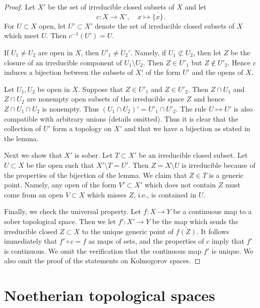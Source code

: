 \begin{proof}
Let $X'$ be the set of irreducible closed subsets of $X$ and let
$$
c : X \to X', \quad x \mapsto \overline{\{x\}}.
$$
For $U \subset X$ open, let $U' \subset X'$ denote the set
of irreducible closed subsets of $X$ which meet $U$.
Then $c^{-1}(U') = U$.

\medskip\noindent
If $U_1 \not = U_2$ are open in $X$, then $U'_1 \not = U_2'$.
Namely, if $U_1 \not \subset U_2$, then
let $Z$ be the closure of an irreducible component of
$U_1 \setminus U_2$.
Then $Z \in U'_1$ but $Z \not \in U'_2$. Hence $c$ induces
a bijection between the subsets of $X'$ of the form $U'$ and the
opens of $X$.

\medskip\noindent
Let $U_1, U_2$ be open in $X$. Suppose that $Z \in U'_1$ and
$Z \in U'_2$. Then $Z \cap U_1$ and $Z \cap U_2$ are nonempty
open subsets of the irreducible space $Z$ and hence $Z \cap U_1 \cap U_2$
is nonempty. Thus $(U_1 \cap U_2)' = U'_1 \cap U'_2$.
The rule $U \mapsto U'$ is also compatible with arbitrary unions
(details omitted). Thus it is clear that the collection of
$U'$ form a topology on $X'$ and that we have a bijection as
stated in the lemma.

\medskip\noindent
Next we show that $X'$ is sober. Let $T \subset X'$ be an irreducible
closed subset. Let $U \subset X$ be the open such that $X' \setminus T = U'$.
Then $Z = X \setminus U$ is irreducible because of the properties
of the bijection of the lemma. We claim that $Z \in T$ is a generic
point. Namely, any open of the form $V' \subset X'$
which does not contain $Z$ must come from an open $V \subset X$
which misses $Z$, i.e., is contained in $U$.

\medskip\noindent
Finally, we check the universal property. Let $f : X \to Y$ be a continuous
map to a sober topological space. Then we let $f' : X' \to Y$ be the map
which sends the irreducible closed $Z \subset X$ to the unique generic
point of $\overline{f(Z)}$. It follows immediately that
$f' \circ c = f$ as maps of sets, and the properties of $c$ imply that
$f'$ is continuous. We omit the verification that the continuous
map $f'$ is unique. We also omit the proof of the statements on
Kolmogorov spaces.
\end{proof}



\section{Noetherian topological spaces}
\label{section-noetherian}

